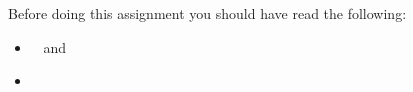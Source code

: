Before doing this assignment you should have read the following:
\begin{itemize}
  \item {}~\cite{MSB2011v} and
  \item {}~\cite{MSB2011r}
\end{itemize}
